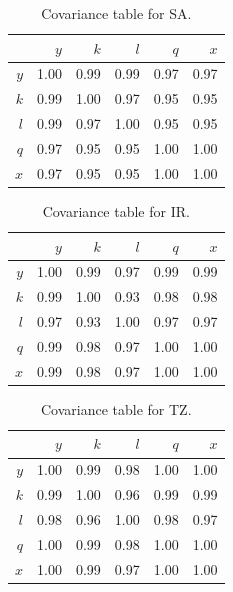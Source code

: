 \documentclass[preprint,authoryear,12pt]{elsarticle}\usepackage{graphicx, color}
\begin{document}
\begin{table}[H]
\begin{center}
\caption{Covariance table for SA.}
\label{tab:Covariance_SA}
{\tiny
\begin{tabular}{rrrrrr}
  \hline
 & $y$ & $k$ & $l$ & $q$ & $x$ \\ 
  \hline
$y$ & 1.00 & 0.99 & 0.99 & 0.97 & 0.97 \\ 
  $k$ & 0.99 & 1.00 & 0.97 & 0.95 & 0.95 \\ 
  $l$ & 0.99 & 0.97 & 1.00 & 0.95 & 0.95 \\ 
  $q$ & 0.97 & 0.95 & 0.95 & 1.00 & 1.00 \\ 
  $x$ & 0.97 & 0.95 & 0.95 & 1.00 & 1.00 \\ 
   \hline
\end{tabular}
}
\end{center}
\end{table}
\begin{table}[H]
\begin{center}
\caption{Covariance table for IR.}
\label{tab:Covariance_IR}
{\tiny
\begin{tabular}{rrrrrr}
  \hline
 & $y$ & $k$ & $l$ & $q$ & $x$ \\ 
  \hline
$y$ & 1.00 & 0.99 & 0.97 & 0.99 & 0.99 \\ 
  $k$ & 0.99 & 1.00 & 0.93 & 0.98 & 0.98 \\ 
  $l$ & 0.97 & 0.93 & 1.00 & 0.97 & 0.97 \\ 
  $q$ & 0.99 & 0.98 & 0.97 & 1.00 & 1.00 \\ 
  $x$ & 0.99 & 0.98 & 0.97 & 1.00 & 1.00 \\ 
   \hline
\end{tabular}
}
\end{center}
\end{table}
\begin{table}[H]
\begin{center}
\caption{Covariance table for TZ.}
\label{tab:Covariance_TZ}
{\tiny
\begin{tabular}{rrrrrr}
  \hline
 & $y$ & $k$ & $l$ & $q$ & $x$ \\ 
  \hline
$y$ & 1.00 & 0.99 & 0.98 & 1.00 & 1.00 \\ 
  $k$ & 0.99 & 1.00 & 0.96 & 0.99 & 0.99 \\ 
  $l$ & 0.98 & 0.96 & 1.00 & 0.98 & 0.97 \\ 
  $q$ & 1.00 & 0.99 & 0.98 & 1.00 & 1.00 \\ 
  $x$ & 1.00 & 0.99 & 0.97 & 1.00 & 1.00 \\ 
   \hline
\end{tabular}
}
\end{center}
\end{table}
\end{document}
